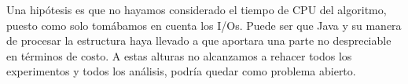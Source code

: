 \documentclass[letterpaper,11pt]{article} %
\begin{document}
			Una hipótesis es que no hayamos considerado el tiempo de CPU del algoritmo, puesto como solo tomábamos en cuenta los I/Os. Puede ser que Java y su manera de procesar la estructura haya llevado a que aportara una parte no despreciable en términos de costo. A estas alturas no alcanzamos a rehacer todos los experimentos y todos los análisis, podría quedar como problema abierto.
			
			
			
			
			
			
			
	
	
		

\end{document}
